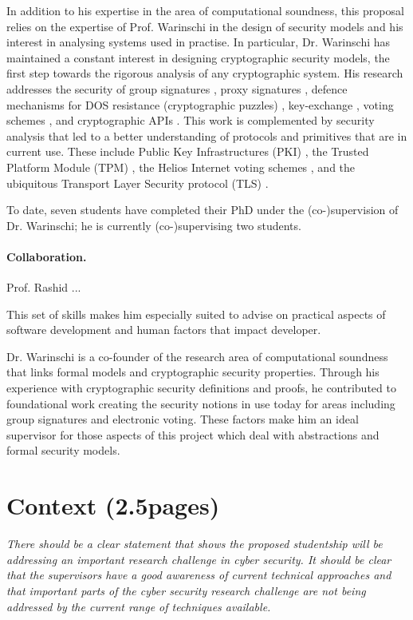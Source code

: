 \documentclass[10pt]{article}
\begin{document}
In addition to his expertise in the area of computational soundness, this proposal relies on the expertise of Prof. Warinschi in the design of security models and his interest in analysing systems used in practise.
In particular, Dr. Warinschi has maintained a constant interest in designing cryptographic security models, the first step towards the rigorous analysis of any cryptographic system. 
His research addresses the security of group signatures \cite{BMW03}, proxy signatures \cite{proxies}, defence mechanisms for DOS resistance (cryptographic puzzles) \cite{puzzles},  key-exchange \cite{ke}, voting schemes \cite{helios}, and cryptographic APIs \cite{KSW11}.
This work is complemented by security analysis that led to a better understanding of protocols and primitives that are in current use.  These include Public Key Infrastructures (PKI) \cite{boldyreva07acloser}, the Trusted Platform Module (TPM) \cite{pcas}, the Helios Internet voting schemes \cite{helios}, and the ubiquitous Transport Layer Security protocol (TLS) \cite{tls}. 



To date, seven students have completed their PhD under the (co-)supervision of Dr. Warinschi; he is currently (co-)supervising two 
students.


\paragraph{Collaboration.}
Prof. Rashid  ...


This set of skills makes him especially suited to advise on practical aspects of software development and human factors that impact developer.


Dr. Warinschi is a co-founder of the research area of computational soundness that links formal models and cryptographic security properties. Through his experience with cryptographic security definitions and proofs, he contributed to foundational work creating the security notions in use today for areas including group signatures and electronic voting. 
These factors make him an ideal supervisor for those aspects of this project which deal with abstractions and formal security models. 


\section{Context (2.5pages)}
\emph{There should be a clear statement that shows the proposed studentship will be addressing an important research challenge in cyber security. It should be clear that the supervisors have a good awareness of current technical approaches and that important parts of the cyber security research challenge are not being addressed by the current range of techniques available.}
\end{document}
